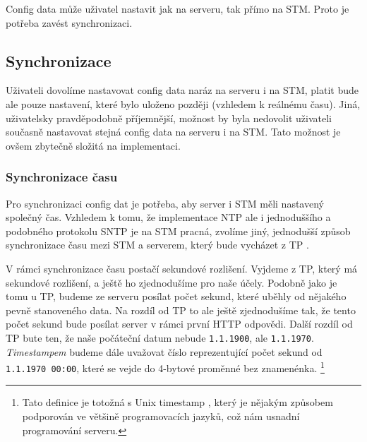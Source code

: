 
Config data může uživatel nastavit jak na serveru, tak přímo na STM.
Proto je potřeba zavést synchronizaci.

\subsection{Synchronizace}

Uživateli dovolíme nastavovat config data naráz na serveru i na STM, platit bude ale pouze
nastavení, které bylo uloženo později (vzhledem k reálnému času).
Jiná, uživatelsky pravděpodobně příjemnější, možnost by byla nedovolit uživateli současně
nastavovat stejná config data na serveru i na STM.
Tato možnost je ovšem zbytečně složitá na implementaci.

\subsubsection{Synchronizace času}

Pro synchronizaci config dat je potřeba, aby server i STM měli nastavený společný čas.
Vzhledem k tomu, že implementace NTP \cite{NTP} ale i jednoduššího a podobného
protokolu SNTP \cite{SNTP} je na STM pracná, zvolíme jiný, jednodušší způsob synchronizace
času mezi STM a serverem, který bude vycházet z TP \cite{TP}.

V rámci synchronizace času postačí sekundové rozlišení.
Vyjdeme z TP, který má sekundové rozlišení, a ještě ho zjednodušíme pro naše účely.
Podobně jako je tomu u TP, budeme ze serveru posílat počet sekund, které
uběhly od nějakého pevně stanoveného data.
Na rozdíl od TP to ale ještě zjednodušíme tak, že tento počet sekund bude posílat server
v rámci první HTTP odpovědi.
Další rozdíl od TP bute ten, že naše počáteční datum nebude \texttt{1.1.1900}, ale \texttt{1.1.1970}.
\emph{Timestampem} budeme dále uvažovat číslo reprezentující počet sekund od \texttt{1.1.1970 00:00},
které se vejde do 4-bytové proměnné bez znamenénka.
\footnote{Tato definice je totožná s Unix timestamp \cite{Unix-timestamp}, který je nějakým způsobem
podporován ve většině programovacích jazyků, což nám usnadní programování serveru.}


